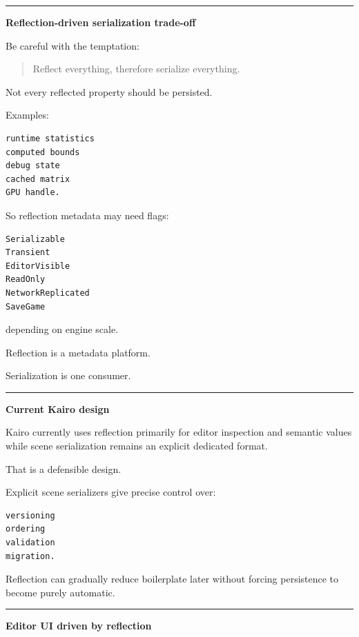 \begin{center}\rule{0.5\linewidth}{0.5pt}\end{center}

\textbf{Reflection-driven serialization trade-off}

Be careful with the temptation:

\begin{quote}
Reflect everything, therefore serialize everything.
\end{quote}

Not every reflected property should be persisted.

Examples:

\begin{verbatim}
runtime statistics
computed bounds
debug state
cached matrix
GPU handle.
\end{verbatim}

So reflection metadata may need flags:

\begin{verbatim}
Serializable
Transient
EditorVisible
ReadOnly
NetworkReplicated
SaveGame
\end{verbatim}

depending on engine scale.

Reflection is a metadata platform.

Serialization is one consumer.

\begin{center}\rule{0.5\linewidth}{0.5pt}\end{center}

\textbf{Current Kairo design}

Kairo currently uses reflection primarily for editor inspection and semantic values while scene serialization remains an explicit dedicated format.

That is a defensible design.

Explicit scene serializers give precise control over:

\begin{verbatim}
versioning
ordering
validation
migration.
\end{verbatim}

Reflection can gradually reduce boilerplate later without forcing persistence to become purely automatic.

\begin{center}\rule{0.5\linewidth}{0.5pt}\end{center}

\textbf{Editor UI driven by reflection}

